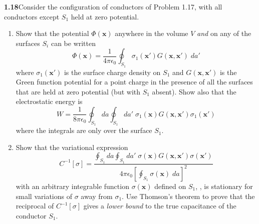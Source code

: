 \par\bigskip
\noindent\textbf{1.18}\quad Consider the configuration of conductors of Problem 1.17, with all conductors except $S_{1}$ held at zero potential.
\begin{enumerate}
\item[(a)] Show that the potential $\Phi(\mathbf{x})$ anywhere in the volume $V$ \emph{and} on any of the surfaces $S_{i}$ can be written
\[
\Phi(\mathbf{x}) = \frac{1}{4\pi\epsilon_{0}}\oint_{S_{1}}\sigma_{1}(\mathbf{x}')G(\mathbf{x},\mathbf{x}')\;da'
\]
where $\sigma_{1}(\mathbf{x}')$ is the surface charge density on $S_{1}$ and $G(\mathbf{x},\mathbf{x}')$ is the Green function potential for a point charge in the presence of all the surfaces that are held at zero potential (but with $S_{1}$ absent). Show also that the electrostatic energy is
\[
W = \frac{1}{8\pi\epsilon_{0}}\oint_{S_{1}}da\oint_{S_{1}}da'\;\sigma_{1}(\mathbf{x})G(\mathbf{x},\mathbf{x}')\sigma_{1}(\mathbf{x}')
\]
where the integrals are only over the surface $S_{1}$.
\item[(b)] Show that the variational expression
\[
C^{-1}[\sigma] = \frac{\displaystyle\oint_{S_{1}}da\oint_{S_{1}}da'\;\sigma(\mathbf{x})G(\mathbf{x},\mathbf{x}')\sigma(\mathbf{x}')}{4\pi\epsilon_{0}\left[\displaystyle\oint_{S_{1}}\sigma(\mathbf{x})\;da\right]^{2}}
\]
with an arbitrary integrable function $\sigma(\mathbf{x})$ defined on $S_{1}$, , is stationary for small variations of $\sigma$ away from $\sigma_{1}$. Use Thomson's theorem to prove that the reciprocal of $C^{-1}[\sigma]$ gives a \emph{lower bound} to the true capacitance of the conductor $S_{1}$.
\end{enumerate}
\solution
